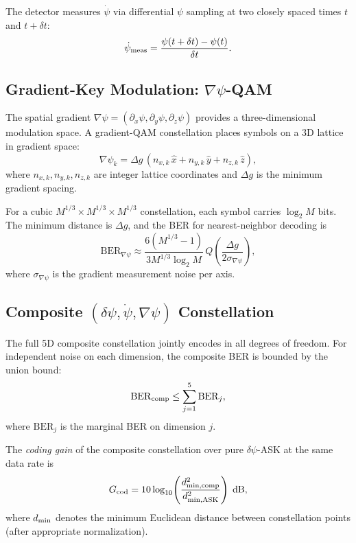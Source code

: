 \documentclass[twocolumn,superscriptaddress,prd,nofootinbib]{revtex4-2}
\newcommand{\BER}{\mathrm{BER}}
\begin{document}
The detector measures $\dot{\psi}$ via differential $\psi$ sampling at
two closely spaced times $t$ and $t + \delta t$:
\begin{equation}
\dot{\psi}_{\rm meas} = \frac{\psi(t+\delta t) - \psi(t)}{\delta t}.
\label{eq:psi-dot-measurement}
\end{equation}

\subsection{Gradient-Key Modulation: $\nabla\psi$-QAM}

The spatial gradient $\nabla\psi = (\partial_x\psi, \partial_y\psi,
\partial_z\psi)$ provides a three-dimensional modulation space.
A gradient-QAM constellation places symbols on a 3D lattice in gradient
space:
\begin{equation}
\nabla\psi_k = \Delta g\,(n_{x,k}\,\hat{x} + n_{y,k}\,\hat{y} +
n_{z,k}\,\hat{z}),
\label{eq:gradient-QAM}
\end{equation}
where $n_{x,k}, n_{y,k}, n_{z,k}$ are integer lattice coordinates and
$\Delta g$ is the minimum gradient spacing.

For a cubic $M^{1/3} \times M^{1/3} \times M^{1/3}$ constellation, each
symbol carries $\log_2 M$ bits.
The minimum distance is $\Delta g$, and the BER for nearest-neighbor
decoding is
\begin{equation}
\BER_{\nabla\psi} \approx \frac{6(M^{1/3}-1)}{3M^{1/3}\log_2 M}\,
Q\!\left(\frac{\Delta g}{2\sigma_{\nabla\psi}}\right),
\label{eq:BER-grad}
\end{equation}
where $\sigma_{\nabla\psi}$ is the gradient measurement noise per axis.

\subsection{Composite $(\delta\psi, \dot{\psi}, \nabla\psi)$
Constellation}

The full 5D composite constellation jointly encodes in all degrees of
freedom.
For independent noise on each dimension, the composite BER is bounded by
the union bound:
\begin{equation}
\BER_{\rm comp} \leq \sum_{j=1}^{5} \BER_j,
\label{eq:composite-BER}
\end{equation}
where $\BER_j$ is the marginal BER on dimension $j$.

The \emph{coding gain} of the composite constellation over pure
$\delta\psi$-ASK at the same data rate is
\begin{equation}
G_{\rm cod} = 10\log_{10}\!\left(\frac{d_{\rm min,comp}^2}{d_{\rm min,ASK}^2}\right)\;\text{dB},
\label{eq:coding-gain}
\end{equation}
where $d_{\rm min}$ denotes the minimum Euclidean distance between
constellation points (after appropriate normalization).
\end{document}
